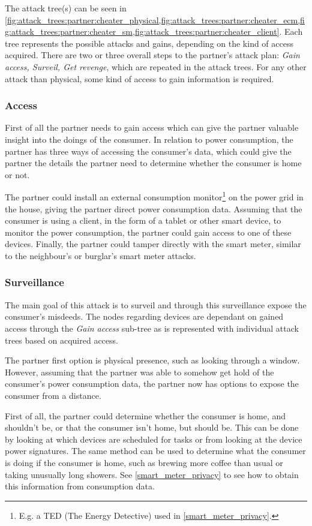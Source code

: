 The attack tree(s) can be seen in \cref{fig:attack_trees:partner:cheater_physical,fig:attack_trees:partner:cheater_ecm,fig:attack_trees:partner:cheater_sm,fig:attack_trees:partner:cheater_client}.
Each tree represents the possible attacks and gains, depending on the kind of access acquired.
There are two or three overall steps to the partner's attack plan: \textit{Gain access, Surveil, Get revenge}, which are repeated in the attack trees.
For any other attack than physical, some kind of access to gain information is required.

\subsubsection{Access}
First of all the partner needs to gain access which can give the partner valuable insight into the doings of the consumer.
In relation to power consumption, the partner has three ways of accessing the consumer's data, which could give the partner the details the partner need to determine whether the consumer is home or not.

The partner could install an external consumption monitor\footnote{E.g. a TED (The Energy Detective) used in \cref {smart_meter_privacy}.} on the power grid in the house, giving the partner direct power consumption data.
Assuming that the consumer is using a client, in the form of a tablet or other smart device, to monitor the power consumption, the partner could gain access to one of these devices.
Finally, the partner could tamper directly with the smart meter, similar to the neighbour's or burglar's smart meter attacks.

\subsubsection{Surveillance}
The main goal of this attack is to surveil and through this surveillance expose the consumer's misdeeds.
The nodes regarding devices are dependant on gained access through the \textit{Gain access} sub-tree as is represented with individual attack trees based on acquired access.

The partner first option is physical presence, such as looking through a window.
However, assuming that the partner was able to somehow get hold of the consumer's power consumption data, the partner now has options to expose the consumer from a distance.

First of all, the partner could determine whether the consumer is home, and shouldn't be, or that the consumer isn't home, but should be.
This can be done by looking at which devices are scheduled for tasks or from looking at the device power signatures.
The same method can be used to determine what the consumer is doing if the consumer is home, such as brewing more coffee than usual or taking unusually long showers.
See \cref{smart_meter_privacy} to see how to obtain this information from consumption data.


